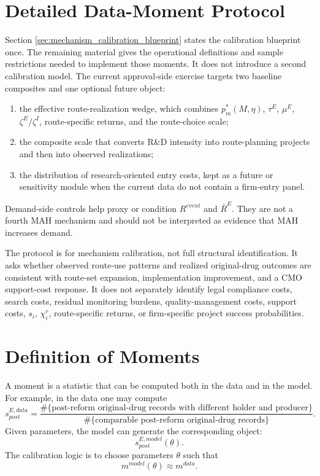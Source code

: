 \documentclass[12pt]{article}
\newcommand{\1}{\mathbf{1}}
\begin{document}
\section{Detailed Data-Moment Protocol}

Section \ref{sec:mechanism_calibration_blueprint} states the calibration blueprint once. The remaining material gives the operational definitions and sample restrictions needed to implement those moments. It does not introduce a second calibration model. The current approval-side exercise targets two baseline composites and one optional future object:
\begin{enumerate}[label=(\roman*),leftmargin=2em]
    \item the effective route-realization wedge, which combines $p_m^*(M,\eta)$, $\tau^E$, $\mu^E$, $\zeta^E/\zeta^I$, route-specific returns, and the route-choice scale;
    \item the composite scale that converts R\&D intensity into route-planning projects and then into observed realizations;
    \item the distribution of research-oriented entry costs, kept as a future or sensitivity module when the current data do not contain a firm-entry panel.
\end{enumerate}

Demand-side controls help proxy or condition $R^{event}$ and $\bar R^E$. They are not a fourth MAH mechanism and should not be interpreted as evidence that MAH increases demand.

The protocol is for mechanism calibration, not full structural identification. It asks whether observed route-use patterns and realized original-drug outcomes are consistent with route-set expansion, implementation improvement, and a CMO support-cost response. It does not separately identify legal compliance costs, search costs, residual monitoring burdens, quality-management costs, support costs, $s_i$, $\chi_i^r$, route-specific returns, or firm-specific project success probabilities.

\section{Definition of Moments}

A moment is a statistic that can be computed both in the data and in the model. For example, in the data one may compute
\[
    s_{post}^{E,data}
    =
    \frac{\#\{\text{post-reform original-drug records with different holder and producer}\}}
    {\#\{\text{comparable post-reform original-drug records}\}}.
\]
Given parameters, the model can generate the corresponding object:
\[
    s_{post}^{E,model}(\theta).
\]
The calibration logic is to choose parameters $\theta$ such that
\[
    m^{model}(\theta) \approx m^{data}.
\]
\end{document}
